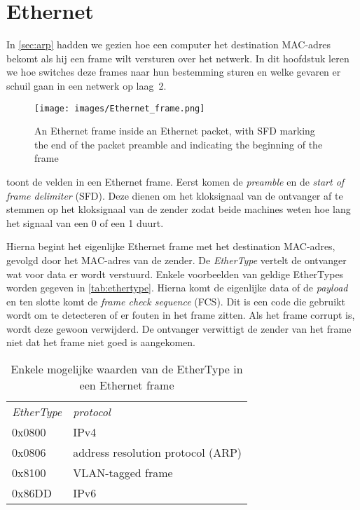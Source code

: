 \chapter{Ethernet}
\label{sec:ethernet}

In \vref{sec:arp} hadden we gezien hoe een computer het destination MAC-adres bekomt als hij een frame wilt versturen over het netwerk.
In dit hoofdstuk leren we hoe switches deze frames naar hun bestemming sturen en welke gevaren er schuil gaan in een netwerk op laag~2.


\begin{figure}[hbp]
    \centering
    \texttt{[image: images/Ethernet\_frame.png]}
    \caption{An Ethernet frame inside an Ethernet packet, with SFD marking the end of the packet preamble and indicating the beginning of the frame}
    \label{fig:ethernet-frame}
\end{figure}


 toont de velden in een Ethernet frame.
Eerst komen de \emph{preamble} en de \emph{start of frame delimiter} (SFD).
Deze dienen om het kloksignaal van de ontvanger af te stemmen op het kloksignaal van de zender zodat beide machines weten hoe lang het signaal van een 0 of een 1 duurt.

Hierna begint het eigenlijke Ethernet frame met het destination MAC-adres, gevolgd door het MAC-adres van de zender.
De \emph{EtherType} vertelt de ontvanger wat voor data er wordt verstuurd.
Enkele voorbeelden van geldige EtherTypes worden gegeven in \vref{tab:ethertype}.
Hierna komt de eigenlijke data of de \emph{payload} en ten slotte komt de \emph{frame check sequence} (FCS).
Dit is een code die gebruikt wordt om te detecteren of er fouten in het frame zitten.
Als het frame corrupt is, wordt deze gewoon verwijderd.
De ontvanger verwittigt de zender van het frame niet dat het frame niet goed is aangekomen.

\begin{table}[htp]
    \centering
    \begin{tabular}{ll}
    \textit{EtherType} & \textit{protocol} \\[1ex]
    0x0800 & IPv4 \\
    0x0806 & address resolution protocol (ARP) \\
    0x8100 & VLAN-tagged frame \\
    0x86DD & IPv6 \\
    \end{tabular}
    \caption{Enkele mogelijke waarden van de EtherType in een Ethernet frame}
    \label{tab:ethertype}
\end{table}


